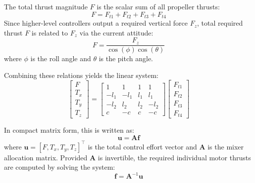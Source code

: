 \documentclass{article}
\begin{document}
	The total thrust magnitude $F$ is the scalar sum of all propeller thrusts:
	\[
	F = F_{t1} + F_{t2} + F_{t3} + F_{t4}
	\]
	Since higher-level controllers output a required vertical force $F_z$, total required thrust $F$ is related to $F_z$ via the current attitude:
	\[
	F = \frac{F_z}{\cos(\phi) \cos(\theta)}
	\]
	where $\phi$ is the roll angle and $\theta$ is the pitch angle.
	
	Combining these relations yields the linear system:
	\[
	\begin{bmatrix}
		F \\
		T_x \\
		T_y \\
		T_z
	\end{bmatrix} = 
	\begin{bmatrix}
		1 & 1 & 1 & 1 \\
		-l_1 & -l_1 & l_1 & l_1 \\
		-l_2 & l_2 & l_2 & -l_2 \\
		c & -c & c & -c
	\end{bmatrix}
	\begin{bmatrix}
		F_{t1} \\
		F_{t2} \\
		F_{t3} \\
		F_{t4}
	\end{bmatrix}
	\]
	
	In compact matrix form, this is written as:
	\[
	\mathbf{u} = \mathbf{A} \mathbf{f}
	\]
	where $\mathbf{u} = [F, T_x, T_y, T_z]^\top$ is the total control effort vector and $\mathbf{A}$ is the mixer allocation matrix. Provided $\mathbf{A}$ is invertible, the required individual motor thrusts are computed by solving the system:
	\[
	\mathbf{f} = \mathbf{A}^{-1} \mathbf{u}
	\]
	
\end{document}
